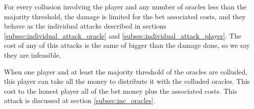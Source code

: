 For every collusion involving the player and any number of oracles less than
  the majority threshold, the damage is limited for the bet associated costs,
  and they behave as the individual attacks described in sections
  \ref{subsec:individual_attack_oracle} and
  \ref{subsec:individual_attack_player}.
The cost of any of this attacks is the same of bigger than the damage done,
  so we say they are infeasible.

When one player and at least the majority threshold of the oracles are colluded,
  this player can take all the money to distribute it with the colluded oracles.
This cost to the honest player all of the bet money plus the associated costs.
This attack is discussed at section \ref{subsec:inc_oracles}.
